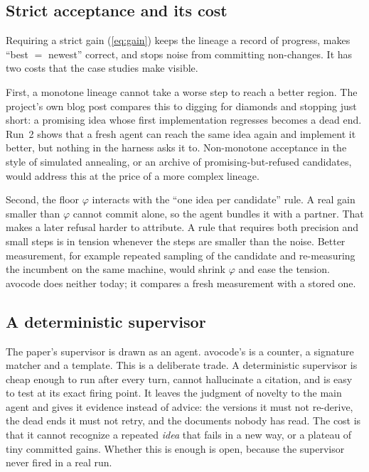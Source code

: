 \subsection{Strict acceptance and its cost}

Requiring a strict gain (\cref{eq:gain}) keeps the lineage a record of progress, makes ``best $=$
newest'' correct, and stops noise from committing non-changes. It has two costs that the case
studies make visible.

First, a monotone lineage cannot take a worse step to reach a better region. The project's own blog
post compares this to digging for diamonds and stopping just short: a promising idea whose first
implementation regresses becomes a dead end. Run~2 shows that a fresh agent can reach the same idea
again and implement it better, but nothing in the harness asks it to. Non-monotone acceptance in the
style of simulated annealing, or an archive of promising-but-refused candidates, would address this
at the price of a more complex lineage.

Second, the floor $\varphi$ interacts with the ``one idea per candidate'' rule. A real gain smaller
than $\varphi$ cannot commit alone, so the agent bundles it with a partner. That makes a later
refusal harder to attribute. A rule that requires both precision and small steps is in tension
whenever the steps are smaller than the noise. Better measurement, for example repeated sampling of
the candidate and re-measuring the incumbent on the same machine, would shrink $\varphi$ and ease
the tension. avocode does neither today; it compares a fresh measurement with a stored one.

\subsection{A deterministic supervisor}

The paper's supervisor is drawn as an agent. avocode's is a counter, a signature matcher and a
template. This is a deliberate trade. A deterministic supervisor is cheap enough to run after every
turn, cannot hallucinate a citation, and is easy to test at its exact firing point. It leaves the
judgment of novelty to the main agent and gives it evidence instead of advice: the versions it
must not re-derive, the dead ends it must not retry, and the documents nobody has read. The cost is
that it cannot recognize a repeated \emph{idea} that fails in a new way, or a plateau of tiny
committed gains. Whether this is enough is open, because the supervisor never fired in a real run.

